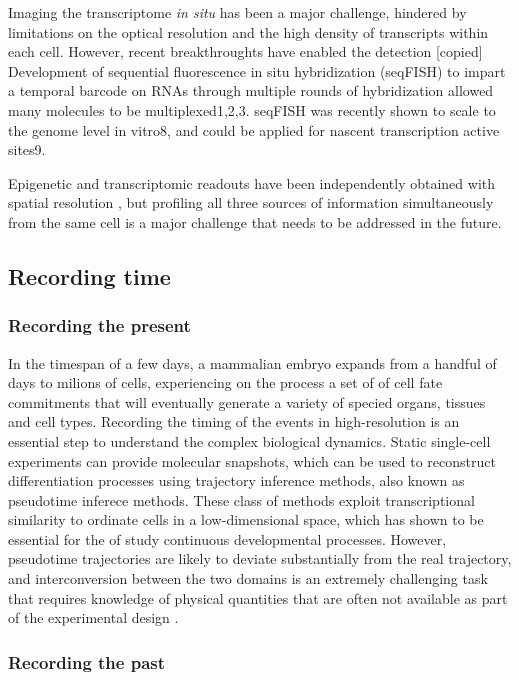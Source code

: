 Imaging the transcriptome \textit{in situ} has been a major challenge, hindered by limitations on the optical resolution and the high density of transcripts within each cell. However, recent breakthroughts have enabled the detection [copied] Development of sequential fluorescence in situ hybridization (seqFISH) to impart a temporal barcode on RNAs through multiple rounds of hybridization allowed many molecules to be multiplexed1,2,3. seqFISH was recently shown to scale to the genome level in vitro8, and could be applied for nascent transcription active sites9.

Epigenetic and transcriptomic readouts have been independently obtained with spatial resolution \cite{XXX}, but profiling all three sources of information simultaneously from the same cell is a major challenge that needs to be addressed in the future. 

\subsection{Recording time} 

\subsubsection{Recording the present} 

In the timespan of a few days, a mammalian embryo expands from a handful of days to milions of cells, experiencing on the process a set of of cell fate commitments that will eventually generate a variety of specied organs, tissues and cell types. Recording the timing of the events in high-resolution is an essential step to understand the complex biological dynamics. Static single-cell experiments can provide molecular snapshots, which can be used to reconstruct differentiation processes using trajectory inference methods, also known as pseudotime inferece methods. These class of methods exploit transcriptional similarity to ordinate cells in a low-dimensional space, which has shown to be essential for the of study continuous developmental processes. However, pseudotime trajectories are likely to deviate substantially from the real trajectory, and interconversion between the two domains is an extremely challenging task that requires knowledge of physical quantities that are often not available as part of the experimental design \cite{MAPIT}.


\subsubsection{Recording the past} 

